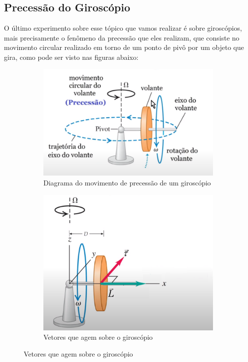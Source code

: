 
\subsection{Precessão do Giroscópio}

O último experimento sobre esse tópico que vamos realizar é sobre giroscópios, mais precisamente o fenômeno da precessão que eles realizam, que consiste no movimento circular realizado em torno de um ponto de pivô por um objeto que gira, como pode ser visto nas figuras abaixo:

\begin{figure}[H]
  \centering
    \begin{subfigure}[b]{0.48\textwidth}
        \centering
        \includegraphics[width=\textwidth]{images/movimento-giroscopio.png}
        \caption{Diagrama do movimento de precessão de um giroscópio}
    \end{subfigure}
    \hfill
    \begin{subfigure}[b]{0.48\textwidth}
        \centering
        \includegraphics[width=\textwidth]{images/propriedades-giroscopio.png}
        \caption{Vetores que agem sobre o giroscópio}
    \end{subfigure}
\end{figure}


